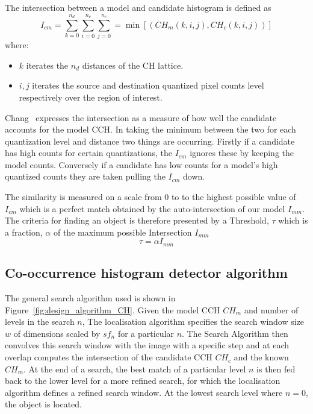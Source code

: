 The intersection between a model and candidate histogram is defined as
\begin{equation}\label{eqn:intersection}
    I_{cm} = \sum_{k=0}^{n_d}\sum_{i=0}^{n_c}\sum_{j=0}^{n_c} = \min[(CH_m(k,i,j),CH_c(k,i,j))]
\end{equation}
where:
\begin{itemize}
    \item $k$ iterates the $n_d$ distances of the CH lattice.
    \item $i,j$ iterates the source and destination quantized pixel counts level respectively over the
        region of interest.
\end{itemize}

Chang~\cite{Chang1999} expresses the intersection as a measure of how well the
candidate accounts for the model CCH\@. In taking the minimum between the two
for each quantization level and distance two things are occurring. Firstly if a
candidate has high counts for certain quantizations, the $I_{cm}$ ignores these
by keeping the model counts. Conversely if a candidate has low counts for a
model's high quantized counts they are taken pulling the $I_{cm}$ down.

The similarity is measured on a scale from 0 to to the highest possible value of
$I_{cm}$ which is a perfect match obtained by the auto-intersection of our
model $I_{mm}$.
The criteria for finding an object is therefore presented by a Threshold, $\tau$ which
is a fraction, $\alpha$ of the maximum possible Intersection $I_{mm}$
\[\tau=\alpha I_{mm}\]

\subsection{Co-occurrence histogram detector algorithm}
The general search algorithm used is shown in
Figure~\ref{fig:design_algorithm_CH}. Given the model CCH $CH_m$ and number of
levels in the search $n$, The localisation algorithm specifies the search window
size $w$ of dimensions scaled by $sf_n$ for a particular $n$. The Search
Algorithm then convolves this search window with the image with a specific step
and at each overlap computes the intersection of the candidate CCH $CH_c$ and
the known $CH_m$.  At the end of a search, the best match of a particular level
$n$ is then fed back to the lower level for a more refined search, for which the
localisation algorithm defines a refined search window. At the lowest search
level where $n=0$, the object is located.


